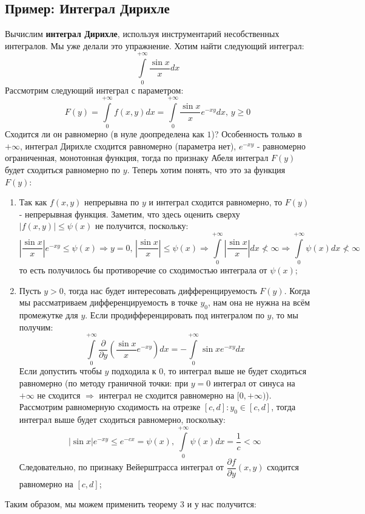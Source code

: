 \documentclass[12pt]{article}
\theoremstyle{definition}
\newcommand{\ddint}[2]{\displaystyle\int\limits_{#1}^{#2}}
\begin{document}
\subsection*{Пример: Интеграл Дирихле}
Вычислим \textbf{интеграл Дирихле}, используя инструментарий несобственных интегралов. Мы уже делали это упражнение. Хотим найти следующий интеграл:
$$
	\ddint{0}{+\infty}\dfrac{\sin{x}}{x}dx
$$
Рассмотрим следующий интеграл с параметром: 
$$
	F(y) = \ddint{0}{+\infty}f(x,y)dx = \ddint{0}{+\infty}\dfrac{\sin{x}}{x}e^{-xy}dx, \, y \geq 0
$$ 
Сходится ли он равномерно (в нуле доопределена как $1$)? Особенность только в $+\infty$, интеграл Дирихле сходится равномерно (параметра нет), $e^{-xy}$ - равномерно ограниченная, монотонная функция, тогда по признаку Абеля интеграл $F(y)$ будет сходиться равномерно по $y$. Теперь хотим понять, что это за функция $F(y)$:
\begin{enumerate}[label=(\arabic*)]
	\item Так как $f(x,y)$ непрерывна по $y$ и интеграл сходится равномерно, то $F(y)$ - непрерывная функция. Заметим, что здесь оценить сверху $|f(x,y)| \leq \psi(x)$ не получится, поскольку: 
	$$
		\left|\dfrac{\sin{x}}{x}\right|e^{-xy} \leq \psi(x) \Rightarrow y =0, \, 
		\left|\dfrac{\sin{x}}{x}\right| \leq \psi(x) \Rightarrow \ddint{0}{+\infty}	\left|\dfrac{\sin{x}}{x}\right|dx \not< \infty \Rightarrow \ddint{0}{+\infty}\psi(x)dx \not< \infty
	$$
	то есть получилось бы противоречие со сходимостью интеграла от $\psi(x)$;
	\item Пусть $y > 0$, тогда нас будет интересовать дифференцируемость $F(y)$. Когда мы рассматриваем дифференцируемость в точке $y_0$, нам она не нужна на всём промежутке для  $y$. Если продифференцировать под интегралом по $y$, то мы получим:
	$$
		\ddint{0}{+\infty}\dfrac{\partial}{\partial y}\left(\dfrac{\sin{x}}{x}e^{-xy}\right)dx = -\ddint{0}{+\infty}\sin{x}e^{-xy}dx
	$$
	Если допустить чтобы $y$ подходила к $0$, то интеграл выше не будет сходиться равномерно (по методу граничной точки: при $y = 0$ интеграл от синуса на $+\infty$ не сходится $\Rightarrow$ интеграл не сходится равномерно на $[0, +\infty)$). Рассмотрим равномерную сходимость на отрезке $[c,d] \colon y_0 \in [c,d]$, тогда интеграл выше будет сходиться равномерно, поскольку:
	$$
		|\sin{x}|e^{-xy}\leq e^{-cx} = \psi(x), \, \ddint{0}{+\infty}\psi(x)dx = \dfrac{1}{c} < \infty	
	$$
	Следовательно, по признаку Вейерштрасса интеграл от $\dfrac{\partial f}{\partial y}(x,y)$ сходится равномерно на $[c,d]$;
\end{enumerate}
Таким образом, мы можем применить теорему $3$ и у нас получится:
\end{document}

